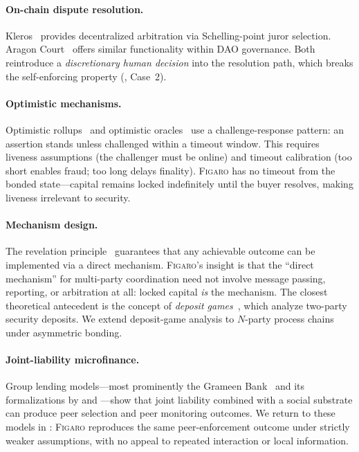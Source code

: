 \documentclass[11pt,a4paper]{article}
\theoremstyle{definition}
\theoremstyle{remark}
\newcommand{\figaro}{\textsc{Figaro}}
\begin{document}
\paragraph{On-chain dispute resolution.}
Kleros~\citep{kleros2019} provides decentralized arbitration via
Schelling-point juror selection. Aragon Court~\citep{aragon2017}
offers similar functionality within DAO governance. Both reintroduce
a \emph{discretionary human decision} into the resolution path,
which breaks the self-enforcing property
(, Case~2).

\paragraph{Optimistic mechanisms.}
Optimistic rollups~\citep{optimism2021} and optimistic
oracles~\citep{uma2020} use a challenge-response pattern: an assertion
stands unless challenged within a timeout window. This requires
liveness assumptions (the challenger must be online) and timeout
calibration (too short enables fraud; too long delays finality).
\figaro{} has no timeout from the bonded state---capital remains
locked indefinitely until the buyer resolves, making liveness
irrelevant to security.

\paragraph{Mechanism design.}
The revelation principle~\citep{myerson1979} guarantees that any
achievable outcome can be implemented via a direct mechanism.
\figaro{}'s insight is that the ``direct mechanism'' for multi-party
coordination need not involve message passing, reporting, or
arbitration at all: locked capital \emph{is} the mechanism. The
closest theoretical antecedent is the concept of \emph{deposit
games}~\citep{asgaonkar2019}, which analyze two-party security
deposits. We extend deposit-game analysis to $N$-party process chains
under asymmetric bonding.

\paragraph{Joint-liability microfinance.}
Group lending models---most prominently the Grameen
Bank~\citep{yunus1999} and its formalizations by
\citet{ghatak1999} and \citet{stiglitz1990}---show that joint
liability combined with a social substrate can produce peer
selection and peer monitoring outcomes. We return to these models in
: \figaro{} reproduces the same
peer-enforcement outcome under strictly weaker assumptions, with no
appeal to repeated interaction or local information.
\end{document}
